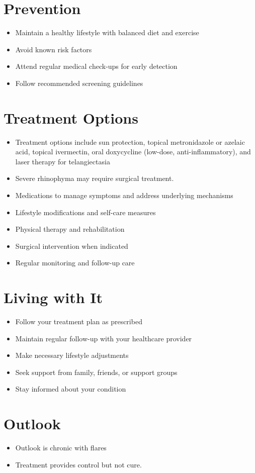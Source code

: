 \section{Prevention}
\begin{itemize}[noitemsep]
  \item Maintain a healthy lifestyle with balanced diet and exercise
  \item Avoid known risk factors
  \item Attend regular medical check-ups for early detection
  \item Follow recommended screening guidelines
\end{itemize}
\section{Treatment Options}
\begin{itemize}[noitemsep]
  \item Treatment options include sun protection, topical metronidazole or azelaic acid, topical ivermectin, oral doxycycline (low-dose, anti-inflammatory), and laser therapy for telangiectasia
  \item Severe rhinophyma may require surgical treatment.
  \item Medications to manage symptoms and address underlying mechanisms
  \item Lifestyle modifications and self-care measures
  \item Physical therapy and rehabilitation
  \item Surgical intervention when indicated
  \item Regular monitoring and follow-up care
\end{itemize}
\section{Living with It}
\begin{itemize}[noitemsep]
  \item Follow your treatment plan as prescribed
  \item Maintain regular follow-up with your healthcare provider
  \item Make necessary lifestyle adjustments
  \item Seek support from family, friends, or support groups
  \item Stay informed about your condition
\end{itemize}
\section{Outlook}
\begin{itemize}[noitemsep]
  \item Outlook is chronic with flares
  \item Treatment provides control but not cure.
\end{itemize}
